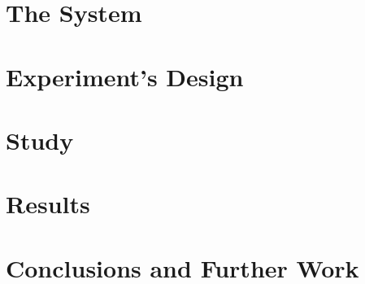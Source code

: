 \section{The System}
\label{sec:system}

\section{Experiment's Design}
\label{sec:experiment}

\section{Study}
\label{sec:study}

\section{Results}
\label{sec:result}

\section{Conclusions and Further Work}






